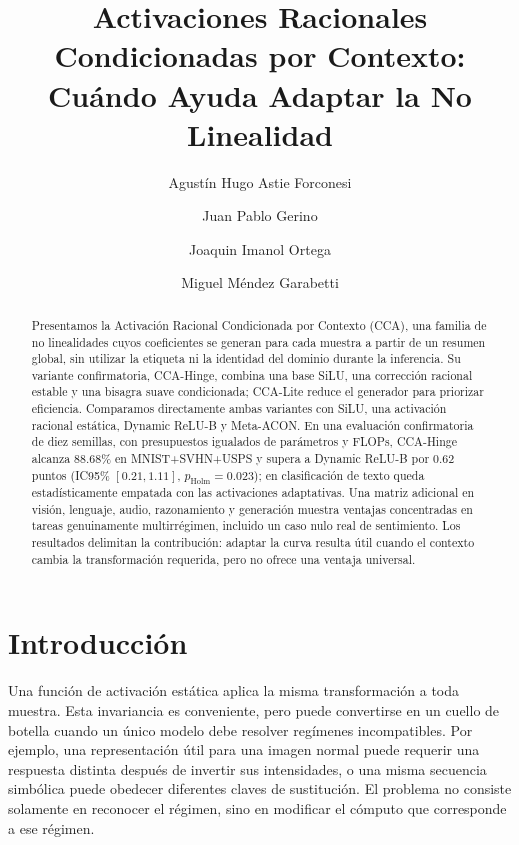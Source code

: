 \documentclass[runningheads]{llncs}
\begin{document}
\title{Activaciones Racionales Condicionadas por Contexto: Cuándo Ayuda Adaptar la No Linealidad}
\author{Agustín Hugo Astie Forconesi \and Juan Pablo Gerino \and Joaquin Imanol Ortega \and Miguel Méndez Garabetti}
\maketitle
\pagestyle{empty}
\thispagestyle{empty}

\begin{abstract}
Presentamos la Activación Racional Condicionada por Contexto (CCA), una familia de no linealidades cuyos coeficientes se generan para cada muestra a partir de un resumen global, sin utilizar la etiqueta ni la identidad del dominio durante la inferencia. Su variante confirmatoria, CCA-Hinge, combina una base SiLU, una corrección racional estable y una bisagra suave condicionada; CCA-Lite reduce el generador para priorizar eficiencia. Comparamos directamente ambas variantes con SiLU, una activación racional estática, Dynamic ReLU-B y Meta-ACON. En una evaluación confirmatoria de diez semillas, con presupuestos igualados de parámetros y FLOPs, CCA-Hinge alcanza $88.68\%$ en MNIST+SVHN+USPS y supera a Dynamic ReLU-B por $0.62$ puntos (IC95\% $[0.21,1.11]$, $p_{\mathrm{Holm}}=0.023$); en clasificación de texto queda estadísticamente empatada con las activaciones adaptativas. Una matriz adicional en visión, lenguaje, audio, razonamiento y generación muestra ventajas concentradas en tareas genuinamente multirrégimen, incluido un caso nulo real de sentimiento. Los resultados delimitan la contribución: adaptar la curva resulta útil cuando el contexto cambia la transformación requerida, pero no ofrece una ventaja universal.
\end{abstract}

\section{Introducción}
Una función de activación estática aplica la misma transformación a toda muestra. Esta invariancia es conveniente, pero puede convertirse en un cuello de botella cuando un único modelo debe resolver regímenes incompatibles. Por ejemplo, una representación útil para una imagen normal puede requerir una respuesta distinta después de invertir sus intensidades, o una misma secuencia simbólica puede obedecer diferentes claves de sustitución. El problema no consiste solamente en reconocer el régimen, sino en modificar el cómputo que corresponde a ese régimen.
\end{document}
